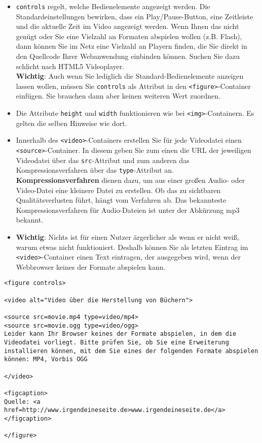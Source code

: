 \begin{itemize}
	\item \verb|controls| regelt, welche Bedienelemente angezeigt werden. Die Standardeinstellungen bewirken, dass ein Play/Pause-Button, eine Zeitleiste und die aktuelle Zeit im Video angezeigt werden. Wenn Ihnen das nicht genügt oder Sie eine Vielzahl an Formaten abspielen wollen (z.B. Flash), dann können Sie im Netz eine Vielzahl an Playern finden, die Sie direkt in den Quellcode Ihrer Webanwendung einbinden können. Suchen Sie dazu schlicht nach \glqq{}HTML5 Videoplayer\grqq{}.\\
	
	\textbf{Wichtig}: Auch wenn Sie lediglich die Standard-Bedienelemente anzeigen lassen wollen, müssen Sie \verb|controls| als Attribut in den \verb|<figure>|-Container einfügen. Sie brauchen dann aber keinen weiteren Wert zuordnen.\\
	
	\item Die Attribute \verb|height| und \verb|width| funktionieren wie bei \verb|<img>|-Containern. Es gelten die selben Hinweise wie dort.
	
	\item Innerhalb des \verb|<video>|-Containers erstellen Sie für jede Videodatei einen \verb|<source>|-Container. In diesem geben Sie zum einen die URL der jeweiligen Videodatei über das \verb|src|-Attribut und zum anderen das Kompressionsverfahren über das \verb|type|-Attribut an.\\

	\textbf{Kompressionsverfahren} dienen dazu, um aus einer großen Audio- oder Video-Datei eine kleinere Datei zu erstellen. Ob das zu sichtbaren Qualitätsverlusten führt, hängt vom Verfahren ab. Das bekannteste Kompressionsverfahren für Audio-Dateien ist unter der Abkürzung mp3 bekannt.\\

	\item \textbf{Wichtig}: Nichts ist für einen Nutzer ärgerlicher als wenn er nicht weiß, warum etwas nicht funktioniert. Deshalb können Sie als letzten Eintrag im \verb|<video>|-Container einen Text eintragen, der ausgegeben wird, wenn der Webbrowser keines der Formate abspielen kann.\\
\end{itemize}

\begin{verbatim}
<figure controls>

<video alt="Video über die Herstellung von Büchern">

<source src=movie.mp4 type=video/mp4>
<source src=movie.ogg type=video/ogg>
Leider kann Ihr Browser keines der Formate abspielen, in dem die Videodatei vorliegt. Bitte prüfen Sie, ob Sie eine Erweiterung installieren können, mit dem Sie eines der folgenden Formate abspielen können: MP4, Vorbis OGG

</video>

<figcaption>
Quelle: <a href=http://www.irgendeineseite.de>www.irgendeineseite.de</a>
</figcaption>

</figure>
\end{verbatim}

